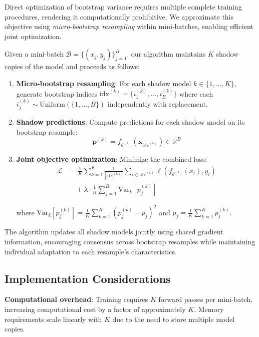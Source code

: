 \documentclass[12pt, letterpaper]{article}
\begin{document}
Direct optimization of bootstrap variance requires multiple complete training procedures, rendering it computationally prohibitive. We approximate this objective using \emph{micro-bootstrap resampling} within mini-batches, enabling efficient joint optimization.

Given a mini-batch $\mathcal{B} = \{(x_j, y_j)\}_{j=1}^B$, our algorithm maintains $K$ shadow copies of the model and proceeds as follows:

\begin{enumerate}
\item \textbf{Micro-bootstrap resampling}: For each shadow model $k \in \{1, \ldots, K\}$, generate bootstrap indices $\text{idx}^{(k)} = \{i_1^{(k)}, \ldots, i_B^{(k)}\}$ where each $i_j^{(k)} \sim \text{Uniform}(\{1, \ldots, B\})$ independently with replacement.

\item \textbf{Shadow predictions}: Compute predictions for each shadow model on its bootstrap resample:
\begin{equation}
\mathbf{p}^{(k)} = f_{\theta^{(k)}}(\mathbf{x}_{\text{idx}^{(k)}}) \in \mathbb{R}^B
\end{equation}

\item \textbf{Joint objective optimization}: Minimize the combined loss:
\begin{align}
\mathcal{L} &= \frac{1}{K}\sum_{k=1}^K \frac{1}{|\text{idx}^{(k)}|}\sum_{i \in \text{idx}^{(k)}} \ell(f_{\theta^{(k)}}(x_i), y_i) \nonumber \\
&\quad + \lambda \cdot \frac{1}{B}\sum_{j=1}^B \text{Var}_k[p_j^{(k)}]
\end{align}

where $\text{Var}_k[p_j^{(k)}] = \frac{1}{K}\sum_{k=1}^K (p_j^{(k)} - \bar{p}_j)^2$ and $\bar{p}_j = \frac{1}{K}\sum_{k=1}^K p_j^{(k)}$.
\end{enumerate}

The algorithm updates all shadow models jointly using shared gradient information, encouraging consensus across bootstrap resamples while maintaining individual adaptation to each resample's characteristics.

\subsection{Implementation Considerations}

\textbf{Computational overhead}: Training requires $K$ forward passes per mini-batch, increasing computational cost by a factor of approximately $K$. Memory requirements scale linearly with $K$ due to the need to store multiple model copies.
\end{document}
